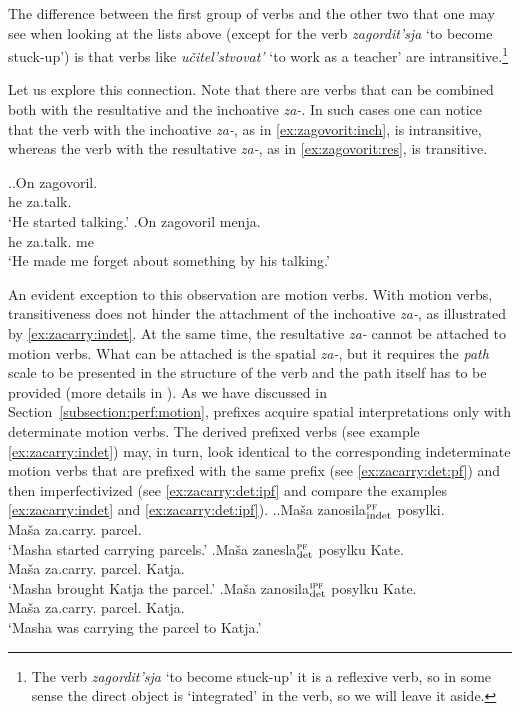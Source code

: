 The difference between the first group of verbs and the other two that one may see when looking at the lists above (except for the verb \textit{zagordit'sja} `to become stuck-up') is that verbs like \textit{u\v{c}itel'stvovat'} `to work as a teacher' are intransitive.\footnote{The verb \textit{zagordit'sja} `to become stuck-up' it is a reflexive verb, so in some sense the direct object is `integrated' in the verb, so we will leave it aside.}

Let us explore this connection. Note that there are verbs that can be combined both with the resultative and the inchoative \textit{za-}. In such cases one can notice that the verb with the inchoative \textit{za-}, as in \ref{ex:zagovorit:inch}, is intransitive, whereas the verb with the resultative \textit{za-}, as in \ref{ex:zagovorit:res}, is transitive.

\ex.\ag.\label{ex:zagovorit:inch}On zagovoril.\\
he za.talk.\\
\trans `He started talking.'
\bg.\label{ex:zagovorit:res}On zagovoril menja.\\
he za.talk. me\\
\trans `He made me forget about something by his talking.'
 
An evident exception to this observation are motion verbs. With motion verbs, transitiveness does not hinder the attachment of the inchoative \textit{za-}, as illustrated by \ref{ex:zacarry:indet}. At the same time, the resultative \textit{za-} cannot be attached to motion verbs. What can be attached is the spatial \textit{za-}, but it requires the \textit{path} scale to be presented in the structure of the verb and the path itself has to be provided (more details in \citealt{ZinovaOsswald:paper}). As we have discussed in Section~\ref{subsection:perf:motion}, prefixes acquire spatial interpretations only with determinate motion verbs. The derived prefixed verbs (see example \ref{ex:zacarry:indet}) may, in turn, look identical to the corresponding indeterminate motion verbs that are prefixed with the same prefix (see \ref{ex:zacarry:det:pf}) and then imperfectivized (see \ref{ex:zacarry:det:ipf} and compare the examples \ref{ex:zacarry:indet} and \ref{ex:zacarry:det:ipf}).
 \ex.\label{ex:zacarry}\ag.\label{ex:zacarry:indet}Ma\v{s}a zanosila$^{\textsc{pf}}_{\text{\normalfont indet}}$ posylki.\\
 Ma\v{s}a za.carry. parcel.\\
 \trans `Masha started carrying parcels.'
\bg.\label{ex:zacarry:det:pf}Ma\v{s}a zanesla$^{\textsc{pf}}_{\text{\normalfont det}}$ posylku Kate.\\
 Ma\v{s}a za.carry. parcel. Katja.\\
 \trans `Masha brought Katja the parcel.'
\bg.\label{ex:zacarry:det:ipf}Ma\v{s}a zanosila$^{\textsc{ipf}}_{\text{\normalfont det}}$ posylku Kate.\\
 Ma\v{s}a za.carry. parcel. Katja.\\
 \trans `Masha was carrying the parcel to Katja.'
 

